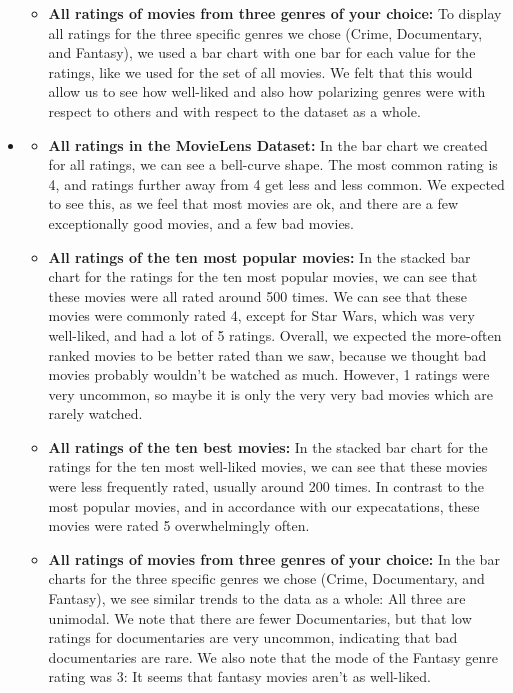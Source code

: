 \begin{itemize}
\begin{itemize}
    \item \textbf{All ratings of movies from three genres of your choice:} To display all ratings for the three specific genres we chose (Crime, Documentary, and Fantasy), we used a bar chart with one bar for each value for the ratings, like we used for the set of all movies. We felt that this would allow us to see how well-liked and also how polarizing genres were with respect to others and with respect to the dataset as a whole.

    \end{itemize}

    \item {}
    \begin{itemize}
    \item \textbf{All ratings in the MovieLens Dataset:} In the bar chart we created for all ratings, we can see a bell-curve shape. The most common rating is 4, and ratings further away from 4 get less and less common. We expected to see this, as we feel that most movies are ok, and there are a few exceptionally good movies, and a few bad movies.

    \item \textbf{All ratings of the ten most popular movies:} In the stacked bar chart for the ratings for the ten most popular movies, we can see that these movies were all rated around 500 times. We can see that these movies were commonly rated 4, except for Star Wars, which was very well-liked, and had a lot of 5 ratings. Overall, we expected the more-often ranked movies to be better rated than we saw, because we thought bad movies probably wouldn't be watched as much. However, 1 ratings were very uncommon, so maybe it is only the very very bad movies which are rarely watched.

    \item \textbf{All ratings of the ten best movies:} In the stacked bar chart for the ratings for the ten most well-liked movies, we can see that these movies were less frequently rated, usually around 200 times. In contrast to the most popular movies, and in accordance with our expecatations, these movies were rated 5 overwhelmingly often.

    \item \textbf{All ratings of movies from three genres of your choice:} In the bar charts for the three specific genres we chose (Crime, Documentary, and Fantasy), we see similar trends to the data as a whole: All three are unimodal. We note that there are fewer Documentaries, but that low ratings for documentaries are very uncommon, indicating that bad documentaries are rare. We also note that the mode of the Fantasy genre rating was 3: It seems that fantasy movies aren't as well-liked.

    \end{itemize}



\end{itemize}


